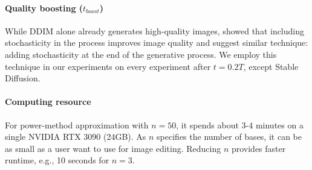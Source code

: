 
\paragraph{Quality boosting ($t_{boost}$)} While DDIM alone already generates high-quality images, \citet{karras2022elucidating} showed that including stochasticity in the process improves image quality and \citet{kwon2022diffusion} suggest similar technique: adding stochasticity at the end of the generative process. We employ this technique in our experiments on every experiment  after $t=0.2T$, except Stable Diffusion.

\paragraph{Computing resource}
For power-method approximation with $n=50$, it spends about 3-4 minutes on a single NVIDIA RTX 3090 (24GB). As $n$ specifies the number of bases, it can be as small as a user want to use for image editing. Reducing $n$ provides faster runtime, e.g., 10 seconds for $n=3$.


